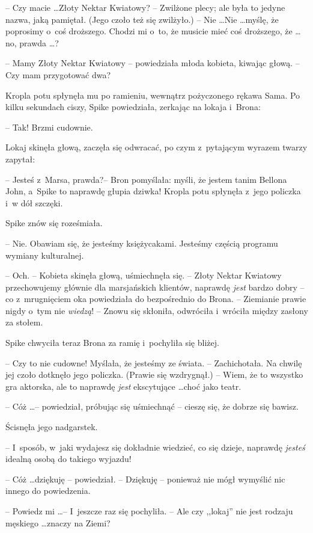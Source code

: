 \documentclass[oneside,polish,11pt,rmheadings]{mwbk}
\begin{document}
-- Czy macie \ldots  Złoty Nektar Kwiatowy?  -- Zwilżone plecy; ale była to jedyne nazwa, jaką pamiętał.  (Jego czoło też się zwilżyło.) -- Nie \ldots  Nie \ldots  myślę, że poprosimy o~coś droższego. Chodzi mi o~to, że musicie mieć coś droższego, że \ldots  no, prawda \ldots ? 

-- Mamy Złoty Nektar Kwiatowy -- powiedziała młoda kobieta, kiwając głową. -- Czy mam przygotować dwa? 

Kropla potu spłynęła mu po ramieniu, wewnątrz pożyczonego rękawa Sama. Po kilku sekundach ciszy, Spike powiedziała, zerkając na lokaja i~Brona: 

-- Tak! Brzmi cudownie. 

Lokaj skinęła głową, zaczęła się odwracać, po czym z~pytającym wyrazem twarzy zapytał: 

-- Jesteś z~Marsa, prawda?-- Bron pomyślała: myśli, że jestem tanim Bellona John, a~Spike to naprawdę głupia dziwka! Kropla potu spłynęła z~jego policzka i~w dół szczęki. 

Spike znów się roześmiała. 

-- Nie. Obawiam się, że jesteśmy księżycakami. Jesteśmy częścią programu wymiany kulturalnej. 


-- Och. -- Kobieta skinęła głową, uśmiechnęła się. -- Złoty Nektar Kwiatowy przechowujemy głównie dla marsjańskich klientów, naprawdę \textit{jest }bardzo dobry -- co z~mrugnięciem oka powiedziała do bezpośrednio do Brona. -- Ziemianie prawie nigdy o~tym nie \textit{wiedzą}! -- Znowu się skłoniła, odwróciła i~wróciła między zasłony za stołem. 

Spike chwyciła teraz Brona za ramię i~pochyliła się bliżej.

-- Czy to nie cudowne! Myślała, że jesteśmy ze świata. -- Zachichotała. Na chwilę jej czoło dotknęło jego policzka. (Prawie się wzdrygnął.) -- Wiem, że to wszystko gra aktorska, ale to naprawdę \textit{jest }ekscytujące \ldots  choć jako teatr. 

-- Cóż \ldots  -- powiedział, próbując się uśmiechnąć -- cieszę się, że dobrze się bawisz. 

Ścisnęła jego nadgarstek. 

-- I~sposób, w~jaki wydajesz się dokładnie wiedzieć, co się dzieje, naprawdę \textit{jesteś} idealną osobą do takiego wyjazdu! 

-- Cóż \ldots  dziękuję -- powiedział. -- Dziękuję -- ponieważ nie mógł wymyślić nic innego do powiedzenia. 

-- Powiedz mi \ldots  -- I~jeszcze raz się pochyliła. -- Ale czy ,,lokaj'' nie jest rodzaju męskiego \ldots  znaczy na Ziemi? 
\end{document}
